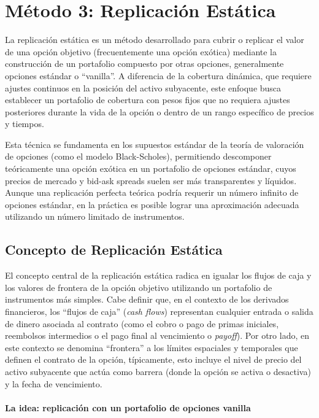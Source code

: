 \chapter{Método 3: Replicación Estática}
\label{chapter:metodo_replicacion}

La replicación estática es un método desarrollado para cubrir o replicar el valor de una opción objetivo (frecuentemente una opción exótica) mediante la construcción de un portafolio compuesto por otras opciones, generalmente opciones estándar o ``vanilla''. A diferencia de la cobertura dinámica, que requiere ajustes continuos en la posición del activo subyacente, este enfoque busca establecer un portafolio de cobertura con pesos fijos que no requiera ajustes posteriores durante la vida de la opción o dentro de un rango específico de precios y tiempos.

Esta técnica se fundamenta en los supuestos estándar de la teoría de valoración de opciones (como el modelo Black-Scholes), permitiendo descomponer teóricamente una opción exótica en un portafolio de opciones estándar, cuyos precios de mercado y bid-ask spreads suelen ser más transparentes y líquidos. Aunque una replicación perfecta teórica podría requerir un número infinito de opciones estándar, en la práctica es posible lograr una aproximación adecuada utilizando un número limitado de instrumentos.

\section{Concepto de Replicación Estática}

El concepto central de la replicación estática radica en igualar los flujos de caja y los valores de frontera de la opción objetivo utilizando un portafolio de instrumentos más simples. Cabe definir que, en el contexto de los derivados financieros, los ``flujos de caja'' (\textit{cash flows}) representan cualquier entrada o salida de dinero asociada al contrato (como el cobro o pago de primas iniciales, reembolsos intermedios o el pago final al vencimiento o \textit{payoff}). Por otro lado, en este contexto se denomina ``frontera'' a los límites espaciales y temporales que definen el contrato de la opción, típicamente, esto incluye el nivel de precio del activo subyacente que actúa como barrera (donde la opción se activa o desactiva) y la fecha de vencimiento.

\subsubsection*{La idea: replicación con un portafolio de opciones vanilla} 

